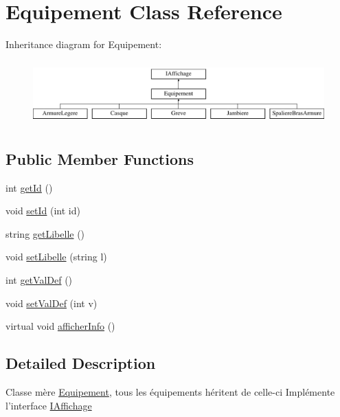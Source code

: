 \hypertarget{class_equipement}{\section{\-Equipement \-Class \-Reference}
\label{class_equipement}
}
\-Inheritance diagram for \-Equipement\-:\begin{figure}[H]
\begin{center}
\leavevmode
\includegraphics[height=2.488889cm]{class_equipement}
\end{center}
\end{figure}
\subsection*{\-Public \-Member \-Functions}
\begin{DoxyCompactItemize}
\item 
int \hyperlink{class_equipement_abc38941f5a9deed943b7a83ce69539c3}{get\-Id} ()
\item 
void \hyperlink{class_equipement_a98208826ad05cbc38211e9f70bd908c5}{set\-Id} (int id)
\item 
string \hyperlink{class_equipement_ab00ec565966647bf6edeb1a9df430aa6}{get\-Libelle} ()
\item 
void \hyperlink{class_equipement_aea246b68c747bd5ec84ca8ce4c4c7b40}{set\-Libelle} (string l)
\item 
int \hyperlink{class_equipement_a7b3003f4da24a94bfec94555e35e772c}{get\-Val\-Def} ()
\item 
void \hyperlink{class_equipement_ad9940c901b3a96b91c5c3f24713face5}{set\-Val\-Def} (int v)
\item 
virtual void \hyperlink{class_equipement_a8db0d237091051e004df0e2274e9e015}{afficher\-Info} ()
\end{DoxyCompactItemize}


\subsection{\-Detailed \-Description}
\-Classe mère \hyperlink{class_equipement}{\-Equipement}, tous les équipements héritent de celle-\/ci \-Implémente l'interface \hyperlink{class_i_affichage}{\-I\-Affichage} 

